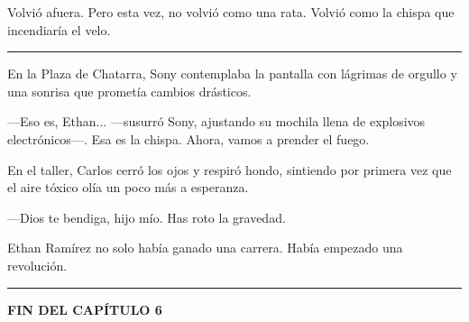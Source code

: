 \documentclass[12pt,a4paper]{book}
\begin{document}
Volvió afuera. Pero esta vez, no volvió como una rata. Volvió como la chispa que incendiaría el velo.

\bigskip
\noindent\rule{\textwidth}{0.4pt}
\bigskip

En la Plaza de Chatarra, Sony contemplaba la pantalla con lágrimas de orgullo y una sonrisa que prometía cambios drásticos.

---Eso es, Ethan... ---susurró Sony, ajustando su mochila llena de explosivos electrónicos---. Esa es la chispa. Ahora, vamos a prender el fuego.

En el taller, Carlos cerró los ojos y respiró hondo, sintiendo por primera vez que el aire tóxico olía un poco más a esperanza.

---Dios te bendiga, hijo mío. Has roto la gravedad.

Ethan Ramírez no solo había ganado una carrera. Había empezado una revolución.

\bigskip
\noindent\rule{\textwidth}{0.4pt}
\bigskip

\textbf{FIN DEL CAPÍTULO 6}
\end{document}
